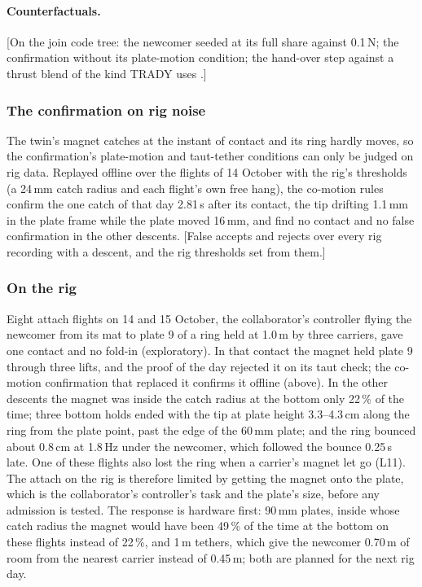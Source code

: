 \paragraph{Counterfactuals.} [On the join code tree: the newcomer seeded at its full share against 0.1\,N; the
confirmation without its plate-motion condition; the hand-over step against a thrust blend of the kind TRADY uses
\cite{sugihara2023trady}.]

\subsubsection{The confirmation on rig noise}

The twin's magnet catches at the instant of contact and its ring hardly moves, so the confirmation's plate-motion and
taut-tether conditions can only be judged on rig data. Replayed offline over the flights of 14 October with the rig's
thresholds (a 24\,mm catch radius and each flight's own free hang), the co-motion rules confirm the one catch of that
day 2.81\,s after its contact, the tip drifting 1.1\,mm in the plate frame while the plate moved 16\,mm, and find no
contact and no false confirmation in the other descents. [False accepts and rejects over every rig recording with a
descent, and the rig thresholds set from them.]

\subsubsection{On the rig}
\label{sec:res_join_rig}

Eight attach flights on 14 and 15 October, the collaborator's controller flying the newcomer from its mat to plate 9
of a ring held at 1.0\,m by three carriers, gave one contact and no fold-in (exploratory). In that contact the magnet
held plate 9 through three lifts, and the proof of the day rejected it on its taut check; the co-motion confirmation
that replaced it confirms it offline (above). In the other descents the magnet was inside the catch radius at the
bottom only 22\,\% of the time; three bottom holds ended with the tip at plate height 3.3--4.3\,cm along the ring from
the plate point, past the edge of the 60\,mm plate; and the ring bounced about 0.8\,cm at 1.8\,Hz under the newcomer,
which followed the bounce 0.25\,s late. One of these flights also lost the ring when a carrier's magnet let go (L11). The attach on the rig is
therefore limited by getting the magnet onto the plate, which is the collaborator's controller's task and the plate's
size, before any admission is tested. The response is hardware first: 90\,mm plates, inside whose catch radius the
magnet would have been 49\,\% of the time at the bottom on these flights instead of 22\,\%, and 1\,m tethers, which give
the newcomer 0.70\,m of room from the nearest carrier instead of 0.45\,m; both are planned for the next rig day.


